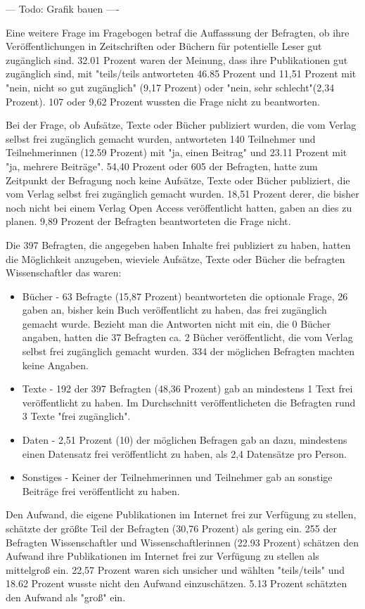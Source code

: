 --- Todo: Grafik bauen ----

Eine weitere Frage im Fragebogen betraf die Auffasssung der Befragten, ob ihre Veröffentlichungen in Zeitschriften oder Büchern für potentielle Leser gut zugänglich sind. 32.01 Prozent waren der Meinung, dass ihre Publikationen gut zugänglich sind, mit "teils/teils antworteten 46.85 Prozent und 11,51 Prozent mit "nein, nicht so gut zugänglich" (9,17 Prozent) oder "nein, sehr schlecht"(2,34 Prozent). 107 oder 9,62 Prozent wussten die Frage nicht zu beantworten.

Bei der Frage, ob Aufsätze, Texte oder Bücher publiziert wurden, die vom Verlag selbst frei zugänglich gemacht wurden, antworteten 140 Teilnehmer und Teilnehmerinnen (12.59 Prozent) mit "ja, einen Beitrag" und 23.11 Prozent mit "ja, mehrere Beiträge". 54,40 Prozent oder 605 der Befragten, hatte zum Zeitpunkt der Befragung noch keine Aufsätze, Texte oder Bücher publiziert, die vom Verlag selbst frei zugänglich gemacht wurden.  18,51 Prozent derer, die bisher noch nicht bei einem Verlag Open Access veröffentlicht hatten, gaben an dies zu planen. 9,89 Prozent der Befragten beantworteten die Frage nicht.  	 

Die 397 Befragten, die angegeben haben Inhalte frei publiziert zu haben, hatten die Möglichkeit anzugeben, wieviele Aufsätze, Texte oder Bücher die befragten Wissenschaftler das waren:
\begin{itemize}
\item Bücher - 63 Befragte (15,87 Prozent) beantworteten die optionale Frage, 26 gaben an, bisher kein Buch veröffentlicht zu haben, das frei zugänglich gemacht wurde. Bezieht man die Antworten nicht mit ein, die 0 Bücher angaben, hatten die 37 Befragten ca. 2 Bücher veröffentlicht, die vom Verlag selbst frei zugänglich gemacht wurden. 334 der möglichen Befragten machten keine Angaben.
\item Texte - 192 der 397 Befragten (48,36 Prozent) gab an mindestens 1 Text frei veröffentlicht zu haben. Im Durchschnitt veröffentlicheten die Befragten rund 3 Texte "frei zugänglich".
\item Daten - 2,51 Prozent (10) der möglichen Befragen gab an dazu, mindestens einen Datensatz frei veröffentlicht zu haben, als 2,4 Datensätze pro Person.
\item Sonstiges - Keiner der Teilnehmerinnen und Teilnehmer gab an sonstige Beiträge frei veröffentlicht zu haben.
\end{itemize}

Den Aufwand, die eigene Publikationen im Internet frei zur Verfügung zu stellen, schätzte der größte Teil der Befragten (30,76 Prozent) als gering ein. 255 der Befragten Wissenschaftler und Wissenschaftlerinnen (22.93 Prozent) schätzen den Aufwand ihre Publikationen im Internet frei zur Verfügung zu stellen als mittelgroß ein.  22,57 Prozent waren sich unsicher und wählten "teils/teils" und 18.62 Prozent wusste nicht den Aufwand einzuschätzen. 5.13 Prozent schätzten den Aufwand als "groß" ein.

